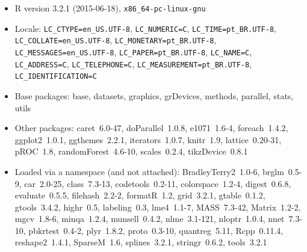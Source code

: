 \documentclass[a4paper,titlepage]{ppgi}\usepackage[]{graphicx}\usepackage[]{color}
\begin{document}
\begin{itemize}\raggedright
  \item R version 3.2.1 (2015-06-18), \verb|x86_64-pc-linux-gnu|
  \item Locale: \verb|LC_CTYPE=en_US.UTF-8|, \verb|LC_NUMERIC=C|, \verb|LC_TIME=pt_BR.UTF-8|, \verb|LC_COLLATE=en_US.UTF-8|, \verb|LC_MONETARY=pt_BR.UTF-8|, \verb|LC_MESSAGES=en_US.UTF-8|, \verb|LC_PAPER=pt_BR.UTF-8|, \verb|LC_NAME=C|, \verb|LC_ADDRESS=C|, \verb|LC_TELEPHONE=C|, \verb|LC_MEASUREMENT=pt_BR.UTF-8|, \verb|LC_IDENTIFICATION=C|
  \item Base packages: base, datasets, graphics, grDevices,
    methods, parallel, stats, utils
  \item Other packages: caret~6.0-47, doParallel~1.0.8,
    e1071~1.6-4, foreach~1.4.2, ggplot2~1.0.1, ggthemes~2.2.1,
    iterators~1.0.7, knitr~1.9, lattice~0.20-31, pROC~1.8,
    randomForest~4.6-10, scales~0.2.4, tikzDevice~0.8.1
  \item Loaded via a namespace (and not attached):
    BradleyTerry2~1.0-6, brglm~0.5-9, car~2.0-25, class~7.3-13,
    codetools~0.2-11, colorspace~1.2-4, digest~0.6.8,
    evaluate~0.5.5, filehash~2.2-2, formatR~1.2, grid~3.2.1,
    gtable~0.1.2, gtools~3.4.2, highr~0.5, labeling~0.3,
    lme4~1.1-7, MASS~7.3-42, Matrix~1.2-2, mgcv~1.8-6,
    minqa~1.2.4, munsell~0.4.2, nlme~3.1-121, nloptr~1.0.4,
    nnet~7.3-10, pbkrtest~0.4-2, plyr~1.8.2, proto~0.3-10,
    quantreg~5.11, Rcpp~0.11.4, reshape2~1.4.1, SparseM~1.6,
    splines~3.2.1, stringr~0.6.2, tools~3.2.1
\end{itemize}


%
%
%
\end{document}
